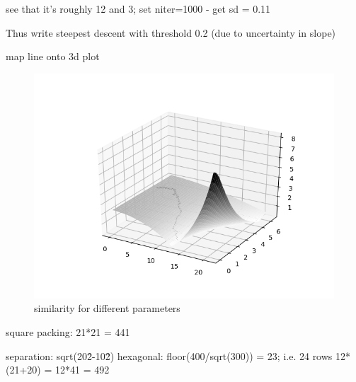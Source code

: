 \documentclass{article}
\begin{document}
see that it's roughly 12 and 3; set niter=1000 - get sd = 0.11

Thus write steepest descent with threshold 0.2 (due to uncertainty in slope)

map line onto 3d plot

\begin{figure}[h]
\centering
\includegraphics[width = 0.5\linewidth, trim={0 0 0 0}, clip=true]{project_descent.png}
\caption{similarity for different parameters}
\label{fig:sim}
\end{figure}

square packing:
21*21 = 441

separation: sqrt(20\^2-10\^2)
hexagonal: floor(400/sqrt(300)) = 23; i.e. 24 rows
12*(21+20) = 12*41 = 492
\end{document}
